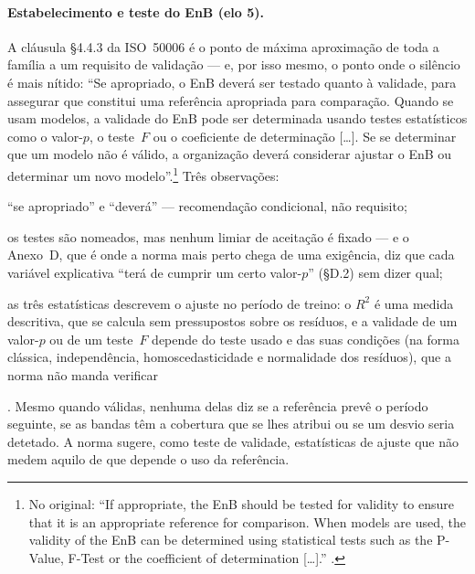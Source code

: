 \paragraph{Estabelecimento e teste do EnB (elo 5).} A cláusula \S4.4.3 da ISO~50006 é o ponto de máxima aproximação de toda a família a um requisito de validação --- e, por isso mesmo, o ponto onde o silêncio é mais nítido: \enquote{Se apropriado, o EnB deverá ser testado quanto à validade, para assegurar que constitui uma referência apropriada para comparação. Quando se usam modelos, a validade do EnB pode ser determinada usando testes estatísticos como o valor-$p$, o teste~$F$ ou o coeficiente de determinação [\ldots]. Se se determinar que um modelo não é válido, a organização deverá considerar ajustar o EnB ou determinar um novo modelo}.\footnote{No original: \enquote{If appropriate, the EnB should be tested for validity to ensure that it is an appropriate reference for comparison. When models are used, the validity of the EnB can be determined using statistical tests such as the P-Value, F-Test or the coefficient of determination [\ldots].} \cite[\S4.4.3]{ISO50006_2014}.} Três observações: \begin{enumerate*}[(i)] \item \enquote{se apropriado} e \enquote{deverá} --- recomendação condicional, não requisito; \item os testes são nomeados, mas nenhum limiar de aceitação é fixado --- e o Anexo~D, que é onde a norma mais perto chega de uma exigência, diz que cada variável explicativa \enquote{terá de cumprir um certo valor-$p$} (\S D.2) sem dizer qual; \item as três estatísticas descrevem o ajuste no período de treino: o $R^2$ é uma medida descritiva, que se calcula sem pressupostos sobre os resíduos, e a validade de um valor-$p$ ou de um teste~$F$ depende do teste usado e das suas condições (na forma clássica, independência, homoscedasticidade e normalidade dos resíduos), que a norma não manda verificar\end{enumerate*}. Mesmo quando válidas, nenhuma delas diz se a referência prevê o período seguinte, se as bandas têm a cobertura que se lhes atribui ou se um desvio seria detetado. A norma sugere, como teste de validade, estatísticas de ajuste que não medem aquilo de que depende o uso da referência.

